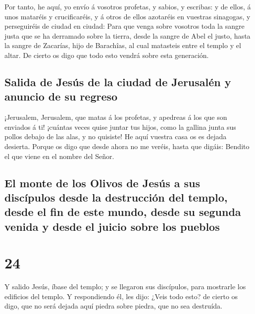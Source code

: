  Por tanto, he aquí, yo envío á vosotros profetas, y
sabios, y escribas: y de ellos, á unos mataréis y crucificaréis, y á
otros de ellos azotaréis en vuestras sinagogas, y perseguiréis de ciudad
en ciudad:  Para que venga sobre vosotros toda la sangre
justa que se ha derramado sobre la tierra, desde la sangre de Abel el
justo, hasta la sangre de Zacarías, hijo de Barachîas, al cual matasteis
entre el templo y el altar.  De cierto os digo que todo
esto vendrá sobre esta generación.

\hypertarget{salida-de-jesuxfas-de-la-ciudad-de-jerusaluxe9n-y-anuncio-de-su-regreso}{%
\subsection{Salida de Jesús de la ciudad de Jerusalén y anuncio de su
regreso}\label{salida-de-jesuxfas-de-la-ciudad-de-jerusaluxe9n-y-anuncio-de-su-regreso}}

 ¡Jerusalem, Jerusalem, que matas á los profetas, y
apedreas á los que son enviados á ti! ¡cuántas veces quise juntar tus
hijos, como la gallina junta sus pollos debajo de las alas, y no
quisiste!  He aquí vuestra casa os es dejada desierta.
 Porque os digo que desde ahora no me veréis, hasta que
digáis: Bendito el que viene en el nombre del Señor.

\hypertarget{el-monte-de-los-olivos-de-jesuxfas-a-sus-discuxedpulos-desde-la-destrucciuxf3n-del-templo-desde-el-fin-de-este-mundo-desde-su-segunda-venida-y-desde-el-juicio-sobre-los-pueblos}{%
\subsection{El monte de los Olivos de Jesús a sus discípulos desde la
destrucción del templo, desde el fin de este mundo, desde su segunda
venida y desde el juicio sobre los
pueblos}\label{el-monte-de-los-olivos-de-jesuxfas-a-sus-discuxedpulos-desde-la-destrucciuxf3n-del-templo-desde-el-fin-de-este-mundo-desde-su-segunda-venida-y-desde-el-juicio-sobre-los-pueblos}}

\hypertarget{section-23}{%
\section{24}\label{section-23}}

 Y salido Jesús, íbase del templo; y se llegaron sus
discípulos, para mostrarle los edificios del templo.  Y
respondiendo él, les dijo: ¿Veis todo esto? de cierto os digo, que no
será dejada aquí piedra sobre piedra, que no sea destruída.

